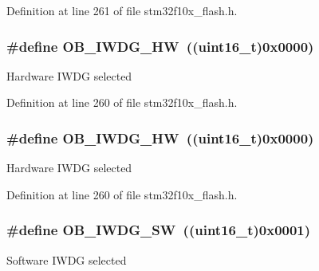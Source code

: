 Definition at line 261 of file stm32f10x\+\_\+flash.\+h.

\subsubsection[{\texorpdfstring{O\+B\+\_\+\+I\+W\+D\+G\+\_\+\+HW}{OB_IWDG_HW}}]{\setlength{\rightskip}{0pt plus 5cm}\#define O\+B\+\_\+\+I\+W\+D\+G\+\_\+\+HW~(({\bf uint16\+\_\+t})0x0000)}\hypertarget{group___option___bytes___i_watchdog_gadfcbfa963d79c339ec8e2d5a7734e47a}{}\label{group___option___bytes___i_watchdog_gadfcbfa963d79c339ec8e2d5a7734e47a}
Hardware I\+W\+DG selected 

Definition at line 260 of file stm32f10x\+\_\+flash.\+h.

\subsubsection[{\texorpdfstring{O\+B\+\_\+\+I\+W\+D\+G\+\_\+\+HW}{OB_IWDG_HW}}]{\setlength{\rightskip}{0pt plus 5cm}\#define O\+B\+\_\+\+I\+W\+D\+G\+\_\+\+HW~(({\bf uint16\+\_\+t})0x0000)}\hypertarget{group___option___bytes___i_watchdog_gadfcbfa963d79c339ec8e2d5a7734e47a}{}\label{group___option___bytes___i_watchdog_gadfcbfa963d79c339ec8e2d5a7734e47a}
Hardware I\+W\+DG selected 

Definition at line 260 of file stm32f10x\+\_\+flash.\+h.

\subsubsection[{\texorpdfstring{O\+B\+\_\+\+I\+W\+D\+G\+\_\+\+SW}{OB_IWDG_SW}}]{\setlength{\rightskip}{0pt plus 5cm}\#define O\+B\+\_\+\+I\+W\+D\+G\+\_\+\+SW~(({\bf uint16\+\_\+t})0x0001)}\hypertarget{group___option___bytes___i_watchdog_ga5a357e232c955444c3f2ccb9a937ffce}{}\label{group___option___bytes___i_watchdog_ga5a357e232c955444c3f2ccb9a937ffce}
Software I\+W\+DG selected 

